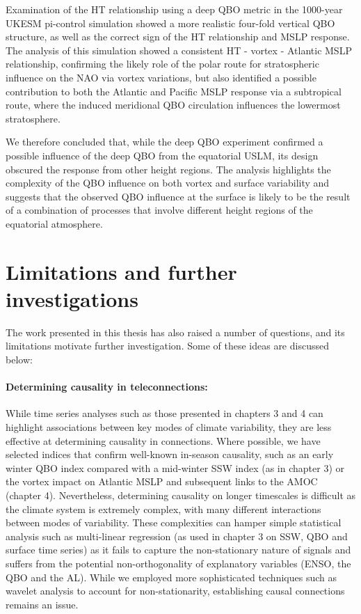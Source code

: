 Examination of the HT relationship using a deep QBO metric in the 1000-year UKESM pi-control simulation showed a more realistic four-fold vertical QBO structure, as well as the correct sign of the HT relationship and MSLP response. The analysis of this simulation showed a consistent HT - vortex - Atlantic MSLP relationship, confirming the likely role of the polar route for stratospheric influence on the NAO via vortex variations, but also identified a possible contribution to both the Atlantic and Pacific MSLP response via a subtropical route, where the induced meridional QBO circulation influences the lowermost stratosphere.  

We therefore concluded that, while the deep QBO experiment confirmed a possible influence of the deep QBO from the equatorial USLM, its design obscured the response from other height regions. The analysis highlights the complexity of the QBO influence on both vortex and surface variability and suggests that the observed QBO influence at the surface is likely to be the result of a combination of processes that involve different height regions of the equatorial atmosphere.  

\section{Limitations and further investigations}
\label{sec:limitations}
The work presented in this thesis has also raised a number of questions, and its limitations motivate further investigation. Some of these ideas are discussed below:

\paragraph{Determining causality in teleconnections:}
While time series analyses such as those presented in chapters 3 and 4 can highlight associations between key modes of climate variability, they are less effective at determining causality in connections. Where possible, we have selected indices that confirm well-known in-season causality, such as an early winter QBO index compared with a mid-winter SSW index (as in chapter 3) or the vortex impact on Atlantic MSLP and subsequent links to the AMOC (chapter 4). Nevertheless, determining causality on longer timescales is difficult as the climate system is extremely complex, with many different interactions between modes of variability. These complexities can hamper simple statistical analysis such as multi-linear regression (as used in chapter 3 on SSW, QBO and surface time series) as it fails to capture the non-stationary nature of signals and suffers from the potential non-orthogonality of explanatory variables (ENSO, the QBO and the AL). While we employed more sophisticated techniques such as wavelet analysis to account for non-stationarity, establishing causal connections remains an issue.

